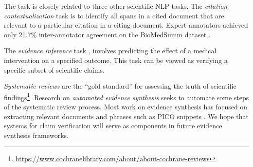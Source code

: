 

\vspace{.2cm} 
\label{sec:related_scinlp}
The \ours task is closely related to three other scientific NLP tasks. 
%
The \emph{citation contextualization} task \cite{Cohan2015MatchingCT,Jaidka2017TheCS} is to identify all spans in a cited document that are relevant to a particular citation in a citing document. Expert annotators achieved only 21.7\% inter-annotator agreement on the BioMedSumm dataset \cite{BiomedSumm}. 

The \emph{evidence inference} task \cite{Lehman2019InferringWM, DeYoung2020EvidenceI2}, involves predicting the effect of a medical intervention on a specified outcome. This task can be viewed as verifying a specific subset of scientific claims.

\emph{Systematic reviews} are the ``gold standard'' for assessing the truth of scientific findings\footnote{\url{https://www.cochranelibrary.com/about/about-cochrane-reviews}}. Research on \emph{automated evidence synthesis} \cite{Marshall2019TowardSR, Beller2018MakingPW, Tsafnat2014SystematicRA, Marshall2017AutomatingBE} seeks to automate some steps of the systematic review process. Most work on evidence synthesis has focused on extracting relevant documents and phrases such as PICO snippets \cite{Nye2018ACW}. We hope that systems for claim verification will serve as components in future evidence synthesis frameworks.
